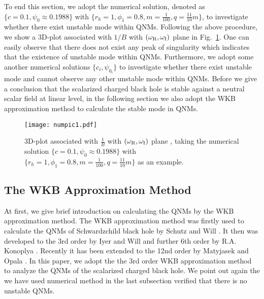 \documentclass[pr, twocolumn, preprintnumbers, showpacs,footnoteadded, superscriptaddress,nofootinbib,longbibliography]{revtex4-1}
\begin{document}
To end this section, we adopt the numerical solution, denoted as $\{c=0.1, \psi_0 \approx 0.1988\}$ with $\{r_h=1, \phi_1=0.8, m=\frac{1}{100}, q=\frac{11}{10}m\}$, to investigate whether there exist unstable mode within QNMs. Following the above procedure, we show a 3D-plot associated with $1/B$ with $(\omega_{\rm R}, \omega_{\rm I})$ plane in Fig.~\ref{numpic1}. One can easily observe that there does not exist any peak of singularity which indicates that the existence of unstable mode within QNMs. Furthermore, we adopt some another numerical solutions $\{c_{i}, \psi_{0_{i}}\}$ to investigate whether there exist unstable mode and cannot observe any other unstable mode within QNMs. Before we give a conclusion that the scalarized charged black hole is stable against a neutral scalar field at linear level, in the following section we also adopt the WKB approximation method to calculate the stable mode in QNMs.
%
\begin{figure}[hbpt]
  \centering
  \texttt{[image: numpic1.pdf]}
  \caption{3D-plot associated with $\frac{1}{B}$ with $(\omega_{\rm R}, \omega_{\rm I})$ plane , taking the numerical solution $\{c=0.1, \psi_0 \approx 0.1988\}$ with $\{r_h=1, \phi_1=0.8, m=\frac{1}{100}, q=\frac{11}{10}m\}$ as an example.}\label{numpic1}
\end{figure}
%

\subsection{The WKB Approximation Method}
At first, we give brief introduction on calculating the QNMs by the WKB approximation method. The WKB approximation method was firstly used to calculate the QNMs of Schwardzchild black hole by Schutz and Will \cite{Shusz}. It then was developed to the 3rd order by Iyer and Will \cite{Iyer:1986np,Iyer:1986nq} and further 6th order by R.A. Konoplya \cite{Konoplya:2003ii}. Recently it has been extended to the 12nd order by Matyjasek and Opala \cite{Matyjasek:2017psv}. In this paper, we adopt the the 3rd order WKB approximation method to analyze the QNMs of the scalarized charged black hole. We point out again the we have used numerical method in the last subsection verified that there is no unstable QNMs.
\end{document}
